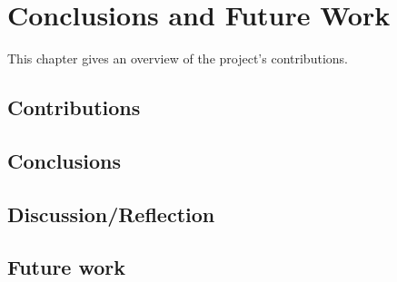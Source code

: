 
\chapter{\label{cha:conclusions}Conclusions and Future Work}

This chapter gives an overview of the project's contributions.


\section{Contributions}


\section{Conclusions}


\section{Discussion/Reflection}


\section{Future work}
